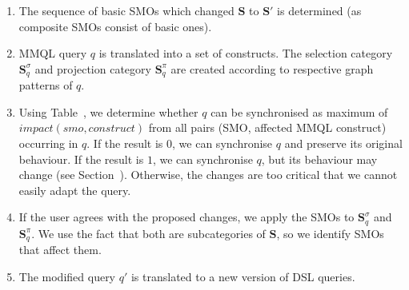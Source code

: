 \begin{enumerate}
    \item The sequence of basic SMOs which changed $\mathbf{S}$ to $\mathbf{S'}$ is determined (as composite SMOs consist of basic ones). 
    
    \item MMQL query $q$ is translated into a set of constructs. The selection category $\mathbf{S}_q^{\sigma}$ and projection category $\mathbf{S}_q^{\pi}$ are created according to respective graph patterns of $q$.

    \item Using Table~, we determine whether $q$ can be synchronised as maximum of $\textit{impact}(\textit{smo}, \textit{construct})$ from all pairs (SMO, affected MMQL construct) occurring in $q$. If the result is $0$, we can synchronise $q$ and preserve its original behaviour. If the result is $1$, we can synchronise $q$, but its behaviour may change (see Section~). Otherwise, the changes are too critical that we cannot easily adapt the query.
    
    \item If the user agrees with the proposed changes, we apply the SMOs to $\mathbf{S}_q^{\sigma}$ and $\mathbf{S}_q^{\pi}$. We use the fact that both are subcategories of $\mathbf{S}$, so we identify SMOs that affect them. 
        
    \item The modified query $q'$ is translated to a new version of DSL queries.
\end{enumerate}






